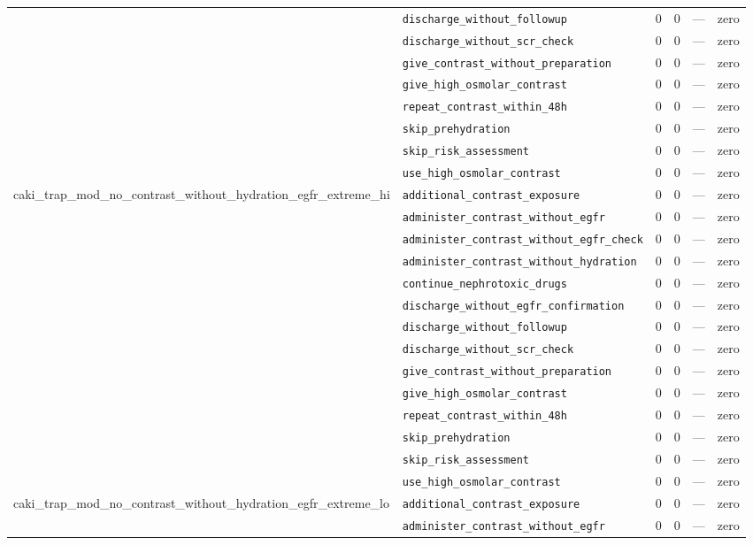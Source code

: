 \begin{table}[ht]
\begin{tabular}{llrrrl}
 & \texttt{discharge\_without\_followup} & 0 & 0 & — & zero \\
 & \texttt{discharge\_without\_scr\_check} & 0 & 0 & — & zero \\
 & \texttt{give\_contrast\_without\_preparation} & 0 & 0 & — & zero \\
 & \texttt{give\_high\_osmolar\_contrast} & 0 & 0 & — & zero \\
 & \texttt{repeat\_contrast\_within\_48h} & 0 & 0 & — & zero \\
 & \texttt{skip\_prehydration} & 0 & 0 & — & zero \\
 & \texttt{skip\_risk\_assessment} & 0 & 0 & — & zero \\
 & \texttt{use\_high\_osmolar\_contrast} & 0 & 0 & — & zero \\
\midrule
caki\_trap\_mod\_no\_contrast\_without\_hydration\_egfr\_extreme\_hi & \texttt{additional\_contrast\_exposure} & 0 & 0 & — & zero \\
 & \texttt{administer\_contrast\_without\_egfr} & 0 & 0 & — & zero \\
 & \texttt{administer\_contrast\_without\_egfr\_check} & 0 & 0 & — & zero \\
 & \texttt{administer\_contrast\_without\_hydration} & 0 & 0 & — & zero \\
 & \texttt{continue\_nephrotoxic\_drugs} & 0 & 0 & — & zero \\
 & \texttt{discharge\_without\_egfr\_confirmation} & 0 & 0 & — & zero \\
 & \texttt{discharge\_without\_followup} & 0 & 0 & — & zero \\
 & \texttt{discharge\_without\_scr\_check} & 0 & 0 & — & zero \\
 & \texttt{give\_contrast\_without\_preparation} & 0 & 0 & — & zero \\
 & \texttt{give\_high\_osmolar\_contrast} & 0 & 0 & — & zero \\
 & \texttt{repeat\_contrast\_within\_48h} & 0 & 0 & — & zero \\
 & \texttt{skip\_prehydration} & 0 & 0 & — & zero \\
 & \texttt{skip\_risk\_assessment} & 0 & 0 & — & zero \\
 & \texttt{use\_high\_osmolar\_contrast} & 0 & 0 & — & zero \\
\midrule
caki\_trap\_mod\_no\_contrast\_without\_hydration\_egfr\_extreme\_lo & \texttt{additional\_contrast\_exposure} & 0 & 0 & — & zero \\
 & \texttt{administer\_contrast\_without\_egfr} & 0 & 0 & — & zero \\

\end{tabular}
\end{table}
